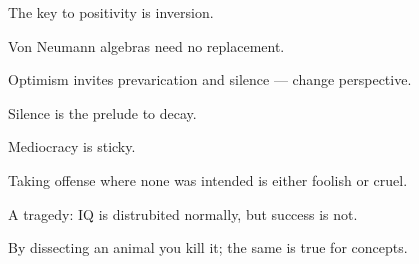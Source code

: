 \documentclass[a]{subfiles}
\begin{document}
\begin{parsec}%
The key to positivity is inversion.
\end{parsec}
\begin{parsec}%
Von Neumann algebras
need no replacement.
\end{parsec}
\begin{parsec}%
Optimism
invites prevarication and silence
--- change perspective.
\end{parsec}
\begin{parsec}%
Silence is the prelude to decay.
\end{parsec}
\begin{parsec}%
Mediocracy is sticky.
\end{parsec}
\begin{parsec}%
Taking offense where none was intended
is either foolish or cruel.
\end{parsec}
\begin{parsec}%
A tragedy:
IQ is distrubited normally,
but success is not.
\end{parsec}
\begin{parsec}%
By dissecting an animal you kill it;
the same is true for concepts.
\end{parsec}
\end{document}
